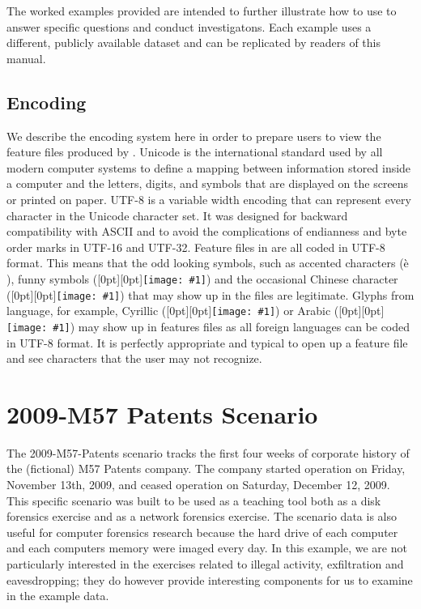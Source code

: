 The worked examples provided are intended to further illustrate how to use \bulk to answer specific questions and conduct investigatons. Each example uses a different, publicly available dataset and can be replicated by readers of this manual. 

\subsection {Encoding}
\newcommand\charpicture[1]{\raisebox{-2pt}[0pt][0pt]{\texttt{[image: \#1]}}}
We describe the encoding system here in order to prepare users to view
the feature files produced by \bulk. Unicode is the international
standard used by all modern computer systems to define a mapping
between information stored inside a computer and the letters, digits,
and symbols that are displayed on the screens or printed on
paper. UTF-8 is a variable width encoding that can represent every
character in the Unicode character set. It was designed for backward
compatibility with ASCII and to avoid the complications of endianness
and byte order marks in UTF-16 and UTF-32. Feature files in \bulk are
all coded in UTF-8 format. This means that the odd looking symbols,
such as accented characters (\`{e} ), funny symbols
(\charpicture{otherPics/U+2234}) and the occasional Chinese
character (\charpicture{otherPics/U+611B}) that may show up in the
files are legitimate. Glyphs from language, for example, Cyrillic
(\charpicture{otherPics/U+0428}) or Arabic (\charpicture{otherPics/U+062D}) may show up in features files as all
foreign languages can be coded in UTF-8 format. It is perfectly
appropriate and typical to open up a feature file and see characters
that the user may not recognize.\\

\section{2009-M57 Patents Scenario}
The 2009-M57-Patents scenario tracks the first four weeks of corporate history of the (fictional) M57 Patents company. The company started operation on Friday, November 13th, 2009, and ceased operation on Saturday, December 12, 2009. This specific scenario was built to be used as a teaching tool both as a disk forensics exercise and as a network forensics exercise. The scenario data is also useful for computer forensics research because the hard drive of each computer and each computers memory were imaged every day. In this example, we are not particularly interested in the exercises related to illegal activity, exfiltration and eavesdropping; they do however provide interesting components for us to examine in the example data\cite{m57scenario}.

